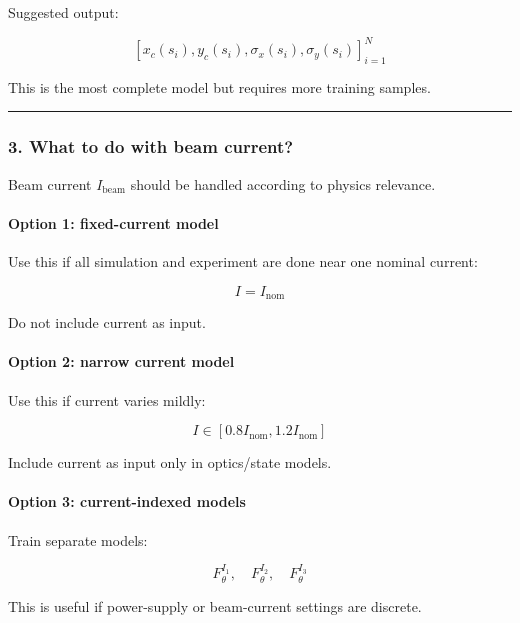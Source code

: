 \documentclass[
]{article}
\begin{document}
Suggested output:

\[
[
x_c(s_i),y_c(s_i),\sigma_x(s_i),\sigma_y(s_i)
]_{i=1}^{N}
\]

This is the most complete model but requires more training samples.

\begin{center}\rule{0.5\linewidth}{0.5pt}\end{center}

\hypertarget{what-to-do-with-beam-current}{%
\subsubsection{3. What to do with beam
current?}\label{what-to-do-with-beam-current}}

Beam current \(I_{\mathrm{beam}}\) should be handled according to
physics relevance.

\hypertarget{option-1-fixed-current-model}{%
\paragraph{Option 1: fixed-current
model}\label{option-1-fixed-current-model}}

Use this if all simulation and experiment are done near one nominal
current:

\[
I = I_{\mathrm{nom}}
\]

Do not include current as input.

\hypertarget{option-2-narrow-current-model}{%
\paragraph{Option 2: narrow current
model}\label{option-2-narrow-current-model}}

Use this if current varies mildly:

\[
I \in [0.8I_{\mathrm{nom}},1.2I_{\mathrm{nom}}]
\]

Include current as input only in optics/state models.

\hypertarget{option-3-current-indexed-models}{%
\paragraph{Option 3: current-indexed
models}\label{option-3-current-indexed-models}}

Train separate models:

\[
F_{\theta}^{I_1},\quad F_{\theta}^{I_2},\quad F_{\theta}^{I_3}
\]

This is useful if power-supply or beam-current settings are discrete.
\end{document}
